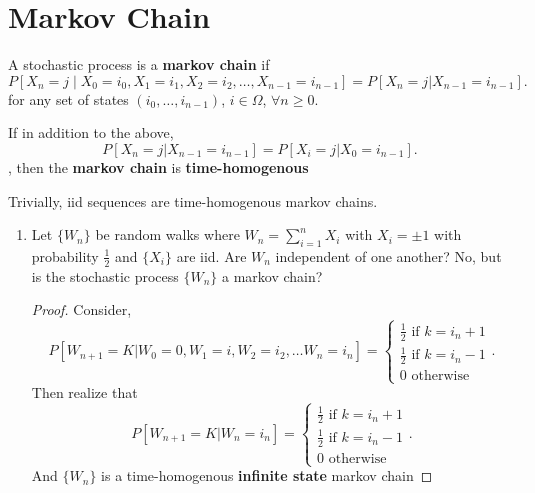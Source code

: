 \documentclass[a4paper]{article}
\begin{document}
  \section{Markov Chain}

  \begin{definition}
    A stochastic process is a \textbf{markov chain} if 
    \[
      P[X_n = j \mid X_0 = i_0, X_1 = i_1, X_2 = i_2, \ldots, X_{n-1}=i_{n-1}] = P[X_n=j | X_{n-1} = i_{n-1}]
    .\] 
    for any set of states $(i_0, \ldots, i_{n-1})$, $i \in \Omega$,  $\forall n \geq 0$.
  \end{definition}

  \begin{definition}
    If in addition to the above, 
    \[
      P[X_n = j | X_{n-1} = i_{n-1}] = P[X_i = j |X_0 = i_{n-1}] 
    .\],
    then the \textbf{markov chain} is \textbf{time-homogenous}
  \end{definition}
  \begin{remark}
    Trivially, iid sequences are time-homogenous markov chains.
  \end{remark}
  \begin{enumerate}
    \item Let $\{W_n\} $ be random walks where $W_n = \sum_{i=1}^{n} X_i$ with $X_i = \pm 1$ with probability  $\frac{1}{2}$ and $\{X_i\} $ are iid. Are $W_n$ independent of one another? No, but is the stochastic process  $\{W_n\}$ a markov chain?
      \begin{proof}
       Consider,
       \[
         P[W_{n+1} = K | W_0 = 0, W_1 = i, W_2 = i_2, \ldots W_n = i_n] = \begin{cases}
           \frac{1}{2} \text{ if $k = i_n + 1$}\\
           \frac{1}{2} \text{ if $k = i_n - 1$} \\
           0 \text{ otherwise}
         \end{cases}
       .\] 
       Then realize that 
       \[
         P[W_{n+1} = K | W_n = i_n] = \begin{cases}
           \frac{1}{2} \text{ if $k = i_n + 1$}\\
           \frac{1}{2} \text{ if $k = i_n - 1$} \\
           0 \text{ otherwise}
         \end{cases}
       .\] 
       And $\{W_n\}$ is a time-homogenous \textbf{infinite state} markov chain
      \end{proof}
  \end{enumerate}
\end{document}
